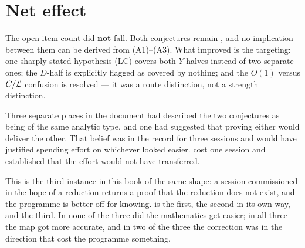 \section{Net effect}
\label{sec:s44-net}

\begin{record}
The open-item count did \textbf{not} fall. Both conjectures remain \OPEN{},
and no implication between them can be derived from (A1)--(A3). What improved
is the targeting: one sharply-stated hypothesis (LC) covers both \(Y\)-halves
instead of two separate ones; the \(D\)-half is explicitly flagged as covered
by nothing; and the \(O(1)\) versus \(C/\mathcal{L}\) confusion is resolved --- it
was a route distinction, not a strength distinction.
\end{record}

\begin{obsv}
\label{obs:resemblance}
Three separate places in the document had described the two conjectures as
being of the same analytic type, and one had suggested that proving either
would deliver the other. That belief was in the record for three sessions and
would have justified spending effort on whichever looked easier.
 cost one session and established that the effort would not have
transferred.

\smallskip
This is the third instance in this book of the same shape: a session
commissioned in the hope of a reduction returns a proof that the reduction
does not exist, and the programme is better off for knowing.  is the
first,  the second in its own way, and  the third. In none of
the three did the mathematics get easier; in all three the map got more
accurate, and in two of the three the correction was in the direction that
cost the programme something.
\end{obsv}
